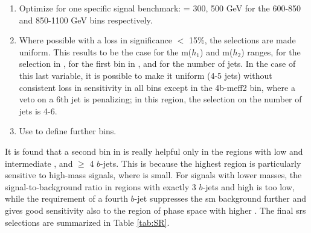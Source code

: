 \begin{enumerate}
\item Optimize for one specific signal benchmark: \mhino = 300, 500 GeV for the 600-850 and 850-1100 GeV \meffb bins respectively.
\item  Where possible with a loss in significance $<$ 15\%, the selections are made uniform. 
This results to be the case for the m($h_1$) and m($h_2$) ranges, for the selection in \met, for the first bin in \dRmax, 
and for the number of jets. In the case of this last variable, it is possible to make it uniform (4-5 jets) 
without consistent loss in sensitivity in all bins except in the 4b-meff2 bin, where a veto on a 6th jet is penalizing; 
in this region, the selection on the number of jets is 4-6.
\item Use \dRmax to define further bins.
\end{enumerate}

It is found that a second bin in \dRmax is really helpful only in the regions with low and intermediate \meffb, and  $\geq$ 4 $b$-jets. 
This is because the highest \meffb region is particularly sensitive to high-mass signals, where \dRmax is small. 
For signals with lower masses, the signal-to-background ratio in regions with exactly 3 $b$-jets and high \dRmax is too low, 
while the requirement of a fourth $b$-jet suppresses the \gls{sm} background further and gives good sensitivity 
also to the region of phase space with higher \dRmax.
The final \glspl{sr} selections are summarized in Table \ref{tab:SR}.

